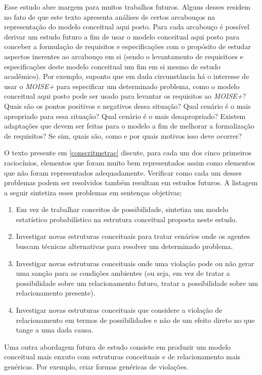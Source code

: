 Esse estudo abre margem para muitos trabalhos futuros. Alguns desses residem no fato de que este texto apresenta análises de certos arcabouços na representação do modelo conceitual aqui posto. Para cada arcabouço é possível derivar um estudo futuro a fim de usar o modelo conceitual aqui posto para conceber a formulação de requisitos e especificações com o propósito de estudar aspectos inerentes ao arcabouço em si (sendo o levantamento de requisitoes e especificações deste modelo conceitual um fim em si mesmo de estudo acadêmico). Por exemplo, suponto que em dada circunstância há o interesse de usar o \textit{MOISE+} para especificar um determinado problema, como o modelo conceitual aqui posto pode ser usado para levantar os requisitos ao \textit{MOISE+}? Quais são os pontos positivos e negativos dessa situação? Qual cenário é o mais apropriado para essa situação? Qual cenário é o mais desapropriado? Existem adaptações que devem ser feitas para o modelo a fim de melhorar a formalização de requisitos? Se sim, quais são, como e por quais motivos isso deve ocorrer? 

O texto presente em \ref{conscritmetrac} discute, para cada um dos cinco primeiros raciocínios, elementos que foram muito bem representados assim como elementos que não foram representados adequadamente. Verificar como cada um desses problemas podem ser resolvidos também resultam em estudos futuros. A listagem a seguir sintetiza esses problemas em sentenças objetivas; 

\begin{enumerate}
    \item Em vez de trabalhar conceitos de possibilidade, sintetiza um modelo estatístico probabilístico na estrutura conceitual proposta neste estudo.
    \item Investigar novas estruturas conceituais para tratar cenários onde os agentes buscam técnicas alternativas para resolver um determinado problema. 
    \item Investigar novas estruturas conceituais onde uma violação pode ou não gerar uma sanção para as condições ambientes (ou seja, em vez de tratar a possibilidade sobre um relacionamento futuro, tratar a possibilidade sobre um relacionamento presente).
    \item Investigar novas estruturas conceituais que considere a violação de relacionamento em termos de possibilidades e não de um efeito direto no que tange a uma dada causa.   
\end{enumerate}

Uma outra abordagem futura de estudo consiste em produzir um modelo conceitual mais enxuto com estruturas conceituais e de relacionamento mais genéricas. Por exemplo, criar formas genéricas de violações.